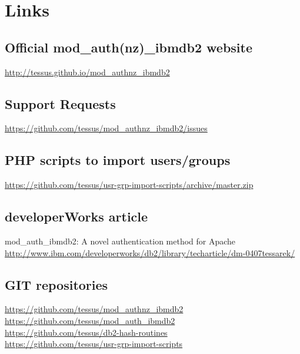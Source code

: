 \section{Links}
\subsection{Official mod\_auth(nz)\_ibmdb2 website}
\url{http://tessus.github.io/mod_authnz_ibmdb2}
\subsection{Support Requests}
\url{https://github.com/tessus/mod_authnz_ibmdb2/issues}
\subsection{PHP scripts to import users/groups}
\mbox{\url{https://github.com/tessus/usr-grp-import-scripts/archive/master.zip}}
\subsection{developerWorks article}
mod\_auth\_ibmdb2: A novel authentication method for Apache\\
\url{http://www.ibm.com/developerworks/db2/library/techarticle/dm-0407tessarek/}
\subsection{GIT repositories}
\url{https://github.com/tessus/mod_authnz_ibmdb2}\\
\url{https://github.com/tessus/mod_auth_ibmdb2}\\
\url{https://github.com/tessus/db2-hash-routines}\\
\url{https://github.com/tessus/usr-grp-import-scripts}\\
